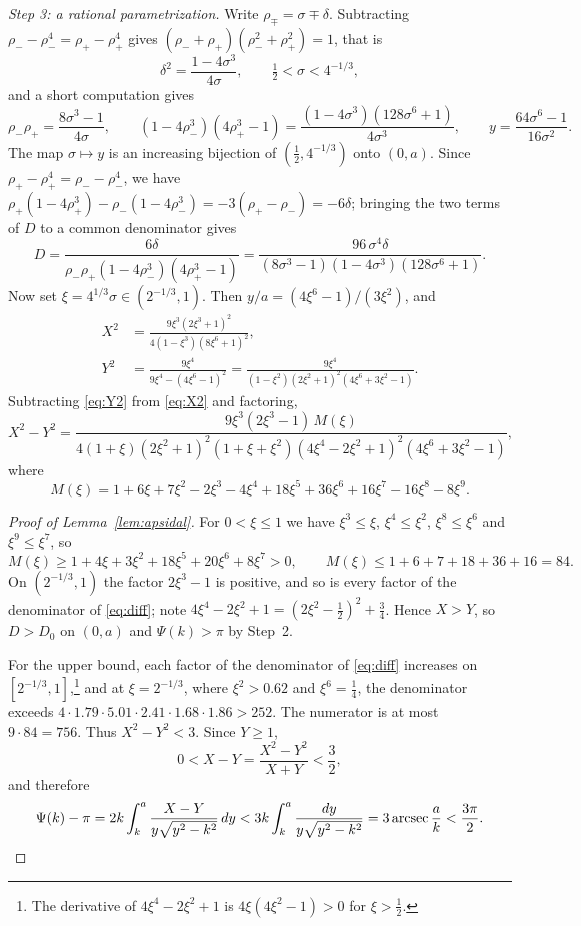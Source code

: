 \documentclass[11pt]{amsart}
\theoremstyle{definition}
\theoremstyle{remark}
\DeclareMathOperator{\arcsec}{arcsec}
\begin{document}
\emph{Step 3: a rational parametrization.} Write $\rho_\mp=\sigma\mp\delta$. Subtracting $\rho_--\rho_-^4=\rho_+-\rho_+^4$ gives $(\rho_-+\rho_+)(\rho_-^2+\rho_+^2)=1$, that is
\[
\delta^2=\frac{1-4\sigma^3}{4\sigma},\qquad \tfrac12<\sigma<4^{-1/3},
\]
and a short computation gives
\[
\rho_-\rho_+=\frac{8\sigma^3-1}{4\sigma},\qquad (1-4\rho_-^3)(4\rho_+^3-1)=\frac{(1-4\sigma^3)(128\sigma^6+1)}{4\sigma^3},\qquad y=\frac{64\sigma^6-1}{16\sigma^2}.
\]
The map $\sigma\mapsto y$ is an increasing bijection of $(\frac12,4^{-1/3})$ onto $(0,a)$. Since $\rho_+-\rho_+^4=\rho_--\rho_-^4$, we have $\rho_+(1-4\rho_+^3)-\rho_-(1-4\rho_-^3)=-3(\rho_+-\rho_-)=-6\delta$; bringing the two terms of $D$ to a common denominator gives
\[
D=\frac{6\delta}{\rho_-\rho_+(1-4\rho_-^3)(4\rho_+^3-1)}=\frac{96\,\sigma^4\delta}{(8\sigma^3-1)(1-4\sigma^3)(128\sigma^6+1)} .
\]
Now set $\xi=4^{1/3}\sigma\in(2^{-1/3},1)$. Then $y/a=(4\xi^6-1)/(3\xi^2)$, and
\begin{align}
X^2&=\frac{9\xi^3(2\xi^3+1)^2}{4(1-\xi^3)(8\xi^6+1)^2},\label{eq:X2}\\
Y^2&=\frac{9\xi^4}{9\xi^4-(4\xi^6-1)^2}=\frac{9\xi^4}{(1-\xi^2)(2\xi^2+1)^2(4\xi^6+3\xi^2-1)} .\label{eq:Y2}
\end{align}
Subtracting \eqref{eq:Y2} from \eqref{eq:X2} and factoring,
\begin{equation}\label{eq:diff}
X^2-Y^2=\frac{9\xi^3(2\xi^3-1)\,M(\xi)}{4(1+\xi)(2\xi^2+1)^2(1+\xi+\xi^2)(4\xi^4-2\xi^2+1)^2(4\xi^6+3\xi^2-1)},
\end{equation}
where
\[
M(\xi)=1+6\xi+7\xi^2-2\xi^3-4\xi^4+18\xi^5+36\xi^6+16\xi^7-16\xi^8-8\xi^9 .
\]

\begin{proof}[Proof of Lemma~\ref{lem:apsidal}]
For $0<\xi\le1$ we have $\xi^3\le\xi$, $\xi^4\le\xi^2$, $\xi^8\le\xi^6$ and $\xi^9\le\xi^7$, so
\[
M(\xi)\ge1+4\xi+3\xi^2+18\xi^5+20\xi^6+8\xi^7>0,\qquad M(\xi)\le1+6+7+18+36+16=84 .
\]
On $(2^{-1/3},1)$ the factor $2\xi^3-1$ is positive, and so is every factor of the denominator of \eqref{eq:diff}; note $4\xi^4-2\xi^2+1=(2\xi^2-\frac12)^2+\frac34$. Hence $X>Y$, so $D>D_0$ on $(0,a)$ and $\Psi(k)>\pi$ by Step~2.

For the upper bound, each factor of the denominator of \eqref{eq:diff} increases on $[2^{-1/3},1]$,\footnote{The derivative of $4\xi^4-2\xi^2+1$ is $4\xi(4\xi^2-1)>0$ for $\xi>\frac12$.} and at $\xi=2^{-1/3}$, where $\xi^2>0.62$ and $\xi^6=\frac14$, the denominator exceeds $4\cdot1.79\cdot5.01\cdot2.41\cdot1.68\cdot1.86>252$. The numerator is at most $9\cdot84=756$. Thus $X^2-Y^2<3$. Since $Y\ge1$,
\[
0<X-Y=\frac{X^2-Y^2}{X+Y}<\frac32 ,
\]
and therefore
\[
\Psi(k)-\pi=2k\int_k^a\frac{X-Y}{y\sqrt{y^2-k^2}}\,dy<3k\int_k^a\frac{dy}{y\sqrt{y^2-k^2}}=3\arcsec\frac ak<\frac{3\pi}2 .\qedhere
\]
\end{proof}
\end{document}
